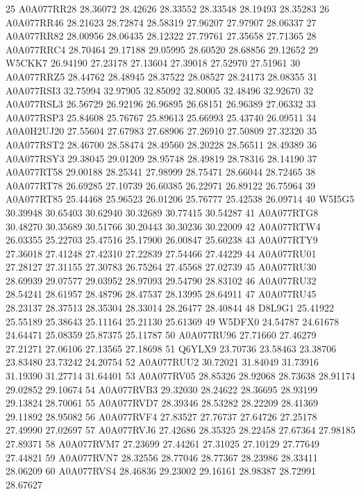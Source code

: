 \documentclass{beamer}
\begin{document}
\begin{frame}[fragile]
\begin{itemize}
\begin{Schunk}
\begin{Soutput}
25   A0A077RR28 28.36072 28.42626 28.33552  28.33548  28.19493  28.35283
26   A0A077RR46 28.21623 28.72874 28.58319  27.96207  27.97907  28.06337
27   A0A077RR82 28.00956 28.06435 28.12322  27.79761  27.35658  27.71365
28   A0A077RRC4 28.70464 29.17188 29.05995  28.60520  28.68856  29.12652
29       W5CKK7 26.94190 27.23178 27.13604  27.39018  27.52970  27.51961
30   A0A077RRZ5 28.44762 28.48945 28.37522  28.08527  28.24173  28.08355
31   A0A077RSI3 32.75994 32.97905 32.85092  32.80005  32.48496  32.92670
32   A0A077RSL3 26.56729 26.92196 26.96895  26.68151  26.96389  27.06332
33   A0A077RSP3 25.84608 25.76767 25.89613  25.66993  25.43740  26.09511
34   A0A0H2UJ20 27.55604 27.67983 27.68906  27.26910  27.50809  27.32320
35   A0A077RST2 28.46700 28.58474 28.49560  28.20228  28.56511  28.49389
36   A0A077RSY3 29.38045 29.01209 28.95748  28.49819  28.78316  28.14190
37   A0A077RT58 29.00188 28.25341 27.98999  28.75471  28.66044  28.72465
38   A0A077RT78 26.69285 27.10739 26.60385  26.22971  26.89122  26.75964
39   A0A077RT85 25.44468 25.96523 26.01206  25.76777  25.42538  26.09714
40       W5I5G5 30.39948 30.65403 30.62940  30.32689  30.77415  30.54287
41   A0A077RTG8 30.48270 30.35689 30.51766  30.20443  30.30236  30.22009
42   A0A077RTW4 26.03355 25.22703 25.47516  25.17900  26.00847  25.60238
43   A0A077RTY9 27.36018 27.41248 27.42310  27.22839  27.54466  27.44229
44   A0A077RU01 27.28127 27.31155 27.30783  26.75264  27.45568  27.02739
45   A0A077RU30 28.69939 29.07577 29.03952  28.97093  29.54790  28.83102
46   A0A077RU32 28.54241 28.61957 28.48796  28.47537  28.13995  28.64911
47   A0A077RU45 28.23137 28.37513 28.35304  28.33014  28.26477  28.40844
48       D8L9G1 25.41922 25.55189 25.38643  25.11164  25.21130  25.61369
49       W5DFX0 24.54787 24.61678 24.64471  25.08359  25.87375  25.11787
50   A0A077RU96 27.71660 27.46279 27.21271  27.06106  27.13565  27.18698
51       Q6YLX9 23.70736 23.58463 23.38706  23.83480  23.73242  24.20754
52   A0A077RUU2 30.72021 31.84049 31.73916  31.19390  31.27714  31.64401
53   A0A077RV05 28.85326 28.92068 28.73638  28.91174  29.02852  29.10674
54   A0A077RVB3 29.32030 28.24622 28.36695  28.93199  29.13824  28.70061
55   A0A077RVD7 28.39346 28.53282 28.22209  28.41369  29.11892  28.95082
56   A0A077RVF4 27.83527 27.76737 27.64726  27.25178  27.49990  27.02697
57   A0A077RVJ6 27.42686 28.35325 28.22458  27.67364  27.98185  27.89371
58   A0A077RVM7 27.23699 27.44261 27.31025  27.10129  27.77649  27.44821
59   A0A077RVN7 28.32556 28.77046 28.77367  28.23986  28.33411  28.06209
60   A0A077RVS4 28.46836 29.23002 29.16161  28.98387  28.72991  28.67627

\end{Soutput}
\end{Schunk}
\end{itemize}
\end{frame}
\end{document}
